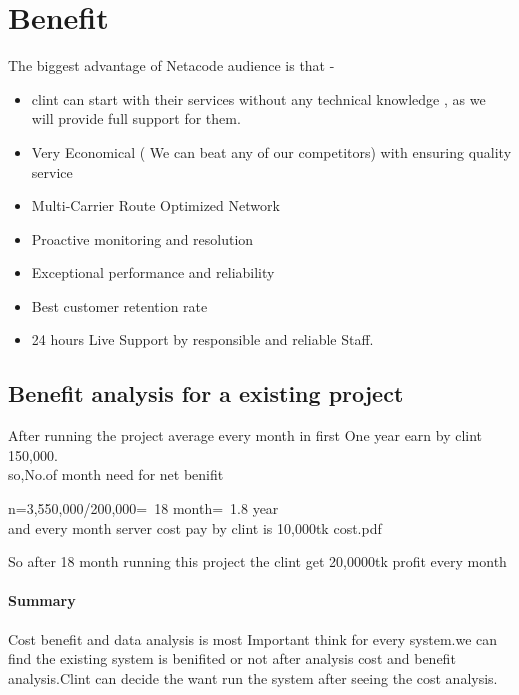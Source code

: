 \documentclass[a4paper,12pt]{report}
\begin{document}
	\section{Benefit}
	The biggest advantage of Netacode audience is that -
	\begin{itemize}
		\item	clint can start with their services without any technical
		knowledge , as we will provide full support for them.
		\item Very Economical ( We can beat any of our competitors) with ensuring quality service
		\item Multi-Carrier Route Optimized Network
		\item Proactive monitoring and resolution
		\item Exceptional performance and reliability
		\item Best customer retention rate
		\item 24 hours Live Support by responsible and reliable Staff.
	\end{itemize} 
\subsection{Benefit analysis for a existing project}
After running the project average every month in first One year  earn by clint 150,000.\\
so,No.of month  need for net benifit\begin{center}
	n=3,550,000/200,000=~18 month=~1.8 year \\
	and every month server cost pay  by clint is 10,000tk
	 {cost.pdf}
\end{center} 
So after 18 month running this project the clint get 20,0000tk profit every month
\paragraph{Summary}
Cost benefit and data analysis is most Important think for every system.we can find the existing system is benifited or not after analysis cost and benefit analysis.Clint can decide the want run the system after seeing the cost analysis.
	
	
\end{document}
